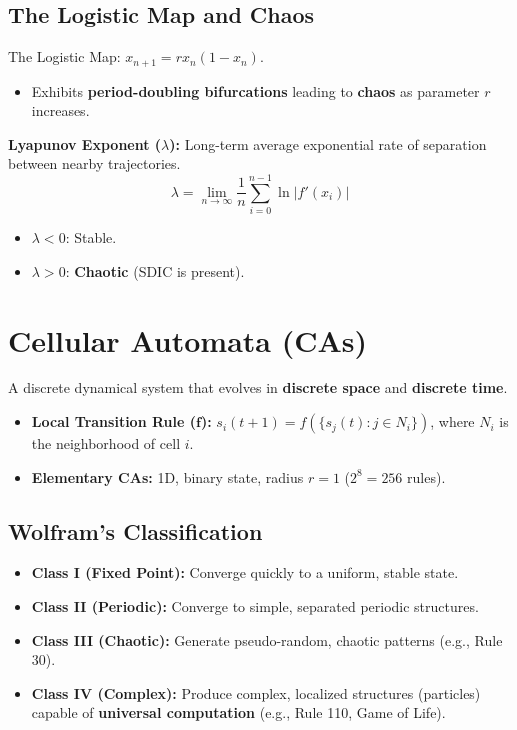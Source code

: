 \documentclass{report}
\begin{document}
\subsection*{The Logistic Map and Chaos}
The Logistic Map: $x_{n+1} = r x_n (1 - x_n)$.
\begin{itemize}
    \item Exhibits \textbf{period-doubling bifurcations} leading to \textbf{chaos} as parameter $r$ increases.
\end{itemize}

\textbf{Lyapunov Exponent ($\lambda$):} Long-term average exponential rate of separation between nearby trajectories.
\[
\lambda = \lim_{n \to \infty} \frac{1}{n} \sum_{i=0}^{n-1} \ln |f'(x_i)|
\]
\begin{itemize}
    \item $\lambda < 0$: Stable.
    \item $\lambda > 0$: \textbf{Chaotic} (SDIC is present).
\end{itemize}

\section*{Cellular Automata (CAs)}
A discrete dynamical system that evolves in \textbf{discrete space} and \textbf{discrete time}.
\begin{itemize}
    \item \textbf{Local Transition Rule ($\mathbf{f}$):} $s_i(t+1) = f(\{s_j(t) : j \in N_i \})$, where $N_i$ is the neighborhood of cell $i$.
    \item \textbf{Elementary CAs:} 1D, binary state, radius $r=1$ ($2^8=256$ rules).
\end{itemize}

\subsection*{Wolfram's Classification}
\begin{itemize}
    \item \textbf{Class I (Fixed Point):} Converge quickly to a uniform, stable state.
    \item \textbf{Class II (Periodic):} Converge to simple, separated periodic structures.
    \item \textbf{Class III (Chaotic):} Generate pseudo-random, chaotic patterns (e.g., Rule 30).
    \item \textbf{Class IV (Complex):} Produce complex, localized structures (particles) capable of \textbf{universal computation} (e.g., Rule 110, Game of Life).
\end{itemize}
\end{document}
